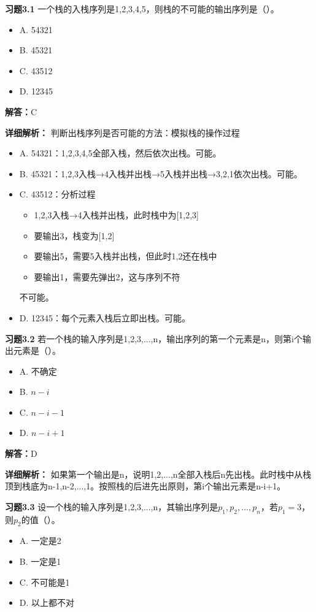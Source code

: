 \documentclass[12pt,a4paper]{amsart}
\begin{document}
\textbf{习题3.1} 一个栈的入栈序列是1,2,3,4,5，则栈的不可能的输出序列是（\quad）。
\begin{itemize}
\item A. 54321
\item B. 45321
\item C. 43512
\item D. 12345
\end{itemize}

\textbf{解答：}C

\textbf{详细解析：}
判断出栈序列是否可能的方法：模拟栈的操作过程
\begin{itemize}
\item A. 54321：1,2,3,4,5全部入栈，然后依次出栈。可能。
\item B. 45321：1,2,3入栈→4入栈并出栈→5入栈并出栈→3,2,1依次出栈。可能。
\item C. 43512：分析过程
    \begin{itemize}
    \item 1,2,3入栈→4入栈并出栈，此时栈中为[1,2,3]
    \item 要输出3，栈变为[1,2]
    \item 要输出5，需要5入栈并出栈，但此时1,2还在栈中
    \item 要输出1，需要先弹出2，这与序列不符
    \end{itemize}
    不可能。
\item D. 12345：每个元素入栈后立即出栈。可能。
\end{itemize}

\textbf{习题3.2} 若一个栈的输入序列是1,2,3,...,n，输出序列的第一个元素是n，则第i个输出元素是（\quad）。
\begin{itemize}
\item A. 不确定
\item B. $n-i$
\item C. $n-i-1$
\item D. $n-i+1$
\end{itemize}

\textbf{解答：}D

\textbf{详细解析：}
如果第一个输出是n，说明1,2,...,n全部入栈后n先出栈。此时栈中从栈顶到栈底为n-1,n-2,...,1。按照栈的后进先出原则，第i个输出元素是n-i+1。

\textbf{习题3.3} 设一个栈的输入序列是1,2,3,...,n，其输出序列是$p_1,p_2,...,p_n$，若$p_1=3$，则$p_2$的值（\quad）。
\begin{itemize}
\item A. 一定是2
\item B. 一定是1
\item C. 不可能是1
\item D. 以上都不对
\end{itemize}
\end{document}
